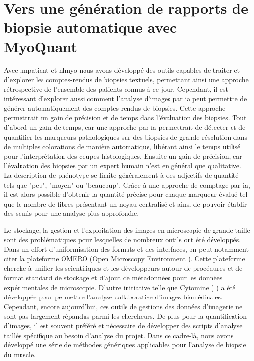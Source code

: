 \chapter{Vers une génération de rapports de biopsie automatique avec MyoQuant}
Avec \gls{impatient} et \gls{nlmyo} nous avons développé des outils capables de traiter et d'explorer les comptes-rendus de biopsies textuels, permettant ainsi une approche rétrospective de l'ensemble des patients connus à ce jour. Cependant, il est intéressant d'explorer aussi comment l'analyse d'images par \gls{ia} peut permettre de générer automatiquement des comptes-rendus de biopsies. Cette approche permettrait un gain de précision et de temps dans l'évaluation des biopsies. Tout d'abord un gain de temps, car une approche par \gls{ia} permettrait de détecter et de quantifier les marqueurs pathologiques sur des biopsies de grande résolution dans de multiples colorations de manière automatique, libérant ainsi le temps utilisé pour l'interprétation des coupes histologiques. Ensuite un gain de précision, car l'évaluation des biopsies par un expert humain n'est en général que qualitative. La description de phénotype se limite généralement à des adjectifs de quantité tels que "peu", "moyen" ou "beaucoup". Grâce à une approche de comptage par \gls{ia}, il est alors possible d'obtenir la quantité précise pour chaque marqueur évalué tel que le nombre de fibres présentant un noyau centralisé et ainsi de pouvoir établir des seuils pour une analyse plus approfondie.

Le stockage, la gestion et l'exploitation des images en microscopie de grande taille sont des problématiques pour lesquelles de nombreux outils ont été développés. Dans un effort d'uniformisation des formats et des interfaces, on peut notamment citer la plateforme OMERO (Open Microscopy Environment \cite{allan_omero_2012}). Cette plateforme cherche à unifier les scientifiques et les développeurs autour de procédures et de format standard de stockage et d'ajout de métadonnées pour les données expérimentales de microscopie. D'autre initiative telle que Cytomine (\cite{maree_collaborative_2016} ) a été développée pour permettre l'analyse collaborative d'images biomédicales. Cependant, encore aujourd'hui, ces outils de gestions des données d'imagerie ne sont pas largement répandus parmi les chercheurs. De plus pour la quantification d'images, il est souvent préféré et nécessaire de développer des scripts d'analyse taillés spécifique au besoin d'analyse du projet. Dans ce cadre-là, nous avons développé une série de méthodes génériques applicables pour l'analyse de biopsie du muscle.

